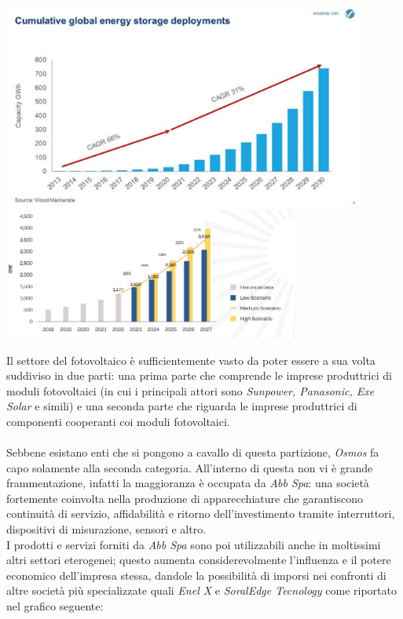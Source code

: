 \documentclass[a4paper, 12pt]{article}
\begin{document}
	\begin{center}
		\includegraphics[width=0.9\textwidth]{Images/previsioni_solare.jpg}
		\includegraphics[width=0.73\textwidth]{Images/andamento_pannelli2.png}
	\end{center}
	Il settore del fotovoltaico è sufficientemente vasto da poter essere a sua volta suddiviso in due parti: una prima parte che comprende le imprese produttrici di moduli fotovoltaici (in cui i principali attori sono \emph{Sunpower, Panasonic, Exe Solar} e simili) e una seconda parte che riguarda le imprese produttrici di componenti cooperanti coi moduli fotovoltaici.\\\\
	Sebbene esistano enti che si pongono a cavallo di questa partizione, \emph{Osmos} fa capo solamente alla seconda categoria. All'interno di questa non vi è grande frammentazione, infatti la maggioranza è occupata da \emph{Abb Spa}: una società fortemente coinvolta nella produzione di apparecchiature che garantiscono continuità di servizio, affidabilità e ritorno dell'investimento tramite interruttori, dispositivi di misurazione, sensori e altro.\\
	I prodotti e servizi forniti da \emph{Abb Spa} sono poi utilizzabili anche in moltissimi altri settori eterogenei; questo aumenta considerevolmente l'influenza e il potere economico dell'impresa stessa, dandole la possibilità di imporsi nei confronti di altre società più specializzate quali \emph{Enel X} e \emph{SoralEdge Tecnology} come riportato nel grafico seguente:\\
\end{document}
